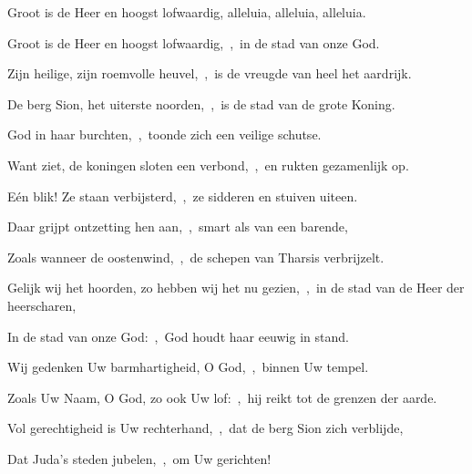 \documentclass[12pt,twoside,a5paper]{article}
\begin{document}

\begin{halfparskip}
  Groot is de Heer en hoogst lofwaardig, alleluia, alleluia, alleluia.

  Groot is de Heer en hoogst lofwaardig,~\sep\ in de stad van onze God.

  Zijn heilige, zijn roemvolle heuvel,~\sep\ is de vreugde van heel het aardrijk.

  De berg Sion, het uiterste noorden,~\sep\ is de stad van de grote Koning.

  God in haar burchten,~\sep\ toonde zich een veilige schutse.

  Want ziet, de koningen sloten een verbond,~\sep\ en rukten gezamenlijk op.

  Eén blik! Ze staan verbijsterd,~\sep\ ze sidderen en stuiven uiteen.

  Daar grijpt ontzetting hen aan,~\sep\ smart als van een barende,

  Zoals wanneer de oostenwind,~\sep\ de schepen van Tharsis verbrijzelt.

  Gelijk wij het hoorden, zo hebben wij het nu gezien,~\sep\ in de stad van de Heer der heerscharen,

  In de stad van onze God:~\sep\ God houdt haar eeuwig in stand.

  Wij gedenken Uw barmhartigheid, O God,~\sep\ binnen Uw tempel.

  Zoals Uw Naam, O God, zo ook Uw lof:~\sep\ hij reikt tot de grenzen der aarde.

  Vol gerechtigheid is Uw rechterhand,~\sep\ dat de berg Sion zich verblijde,

  Dat Juda's steden jubelen,~\sep\ om Uw gerichten!
\end{halfparskip}

\end{document}
